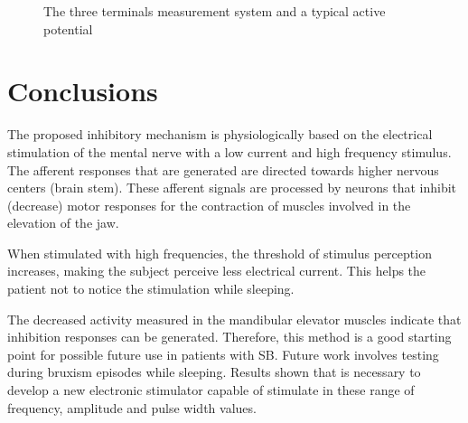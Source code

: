 \documentclass[twocolumn]{htl-author}
\begin{document}
\begin{figure}[!t]
\caption{The three terminals measurement system and a typical active potential}
\end{figure}


\section{Conclusions}
The proposed inhibitory mechanism is physiologically based on the electrical stimulation of the mental nerve with a low current and high frequency stimulus. The afferent responses that are generated are directed towards higher nervous centers (brain stem). These afferent signals are processed by neurons that inhibit (decrease) motor responses for the contraction of muscles involved in the elevation of the jaw.

When stimulated with high frequencies, the threshold of stimulus perception increases, making the subject perceive less electrical current. This helps the patient not to notice the stimulation while sleeping.

The decreased activity measured in the mandibular elevator muscles indicate that inhibition responses can be generated. Therefore, this method is a good starting point for possible future use in patients with SB. Future work involves testing during bruxism episodes while sleeping. Results shown that is necessary to develop a new electronic stimulator capable of stimulate in these range of frequency, amplitude and pulse width values.
\end{document}
